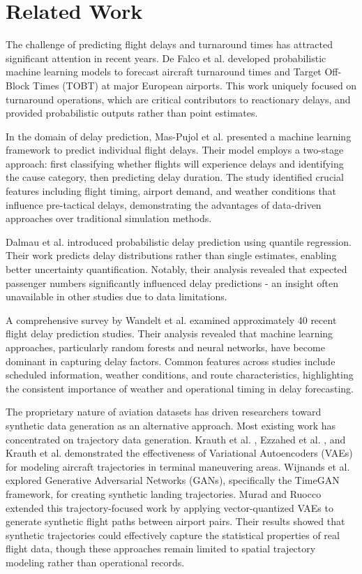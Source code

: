 \documentclass[conference]{IEEEtran}
\begin{document}
\section{Related Work}

The challenge of predicting flight delays and turnaround times has attracted significant attention in recent years. De Falco et al. \cite{de2023probabilistic} developed probabilistic machine learning models to forecast aircraft turnaround times and Target Off-Block Times (TOBT) at major European airports. This work uniquely focused on turnaround operations, which are critical contributors to reactionary delays, and provided probabilistic outputs rather than point estimates.

In the domain of delay prediction, Mas-Pujol et al. \cite{mas2022pre} presented a machine learning framework to predict individual flight delays. Their model employs a two-stage approach: first classifying whether flights will experience delays and identifying the cause category, then predicting delay duration. The study identified crucial features including flight timing, airport demand, and weather conditions that influence pre-tactical delays, demonstrating the advantages of data-driven approaches over traditional simulation methods.

Dalmau et al. \cite{dalmau2024probabilistic} introduced probabilistic delay prediction using quantile regression. Their work predicts delay distributions rather than single estimates, enabling better uncertainty quantification. Notably, their analysis revealed that expected passenger numbers significantly influenced delay predictions - an insight often unavailable in other studies due to data limitations.

A comprehensive survey by Wandelt et al. \cite{wandelt2025flight}  examined approximately 40 recent flight delay prediction studies. Their analysis revealed that machine learning approaches, particularly random forests and neural networks, have become dominant in capturing delay factors. Common features across studies include scheduled information, weather conditions, and route characteristics, highlighting the consistent importance of weather and operational timing in delay forecasting.

The proprietary nature of aviation datasets has driven researchers toward synthetic data generation as an alternative approach. Most existing work has concentrated on trajectory data generation. Krauth et al. \cite{krauth2023deep}, Ezzahed et al. \cite{ezzahed2022bringing}, and Krauth et al. \cite{krauth2024advanced} demonstrated the effectiveness of Variational Autoencoders (VAEs) for modeling aircraft trajectories in terminal maneuvering areas. Wijnands et al. \cite{wijnands2024generation} explored Generative Adversarial Networks (GANs), specifically the TimeGAN framework, for creating synthetic landing trajectories. Murad and Ruocco \cite{murad2025synthetic} extended this trajectory-focused work by applying vector-quantized VAEs to generate synthetic flight paths between airport pairs. Their results showed that synthetic trajectories could effectively capture the statistical properties of real flight data, though these approaches remain limited to spatial trajectory modeling rather than operational records. 
\end{document}
